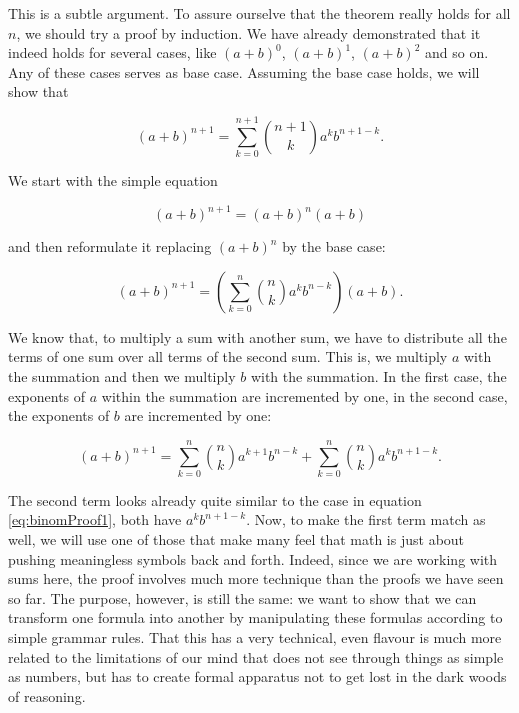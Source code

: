 \documentclass{scrreprt}
\begin{document}
This is a subtle argument.
To assure ourselve
that the theorem really holds for all $n$,
we should try a proof by induction. 
We have already demonstrated
that it indeed holds for several cases,
like $(a + b)^0$, $(a + b)^1$, $(a + b)^2$
and so on.
Any of these cases serves as base case.
Assuming the base case holds,
we will show that

\begin{equation}\label{eq:binomProof1}
  (a + b)^{n + 1} = \sum_{k=0}^{n + 1}{\binom{n + 1}{k}a^kb^{n+1-k}}.
\end{equation}

We start with the simple equation

\begin{equation}
  (a + b)^{n + 1} = (a + b)^n (a + b)
\end{equation}

and then reformulate it replacing $(a + b)^n$ by the base case:

\begin{equation}
  (a + b)^{n + 1} = \left(\sum_{k=0}^{n}{\binom{n}{k}a^kb^{n-k}}\right) (a + b).
\end{equation}

We know that, to multiply a sum with another sum, 
we have to distribute
all the terms of one sum over all terms of the second sum.
This is, we multiply $a$ with the summation 
and then we multiply $b$ with the summation.
In the first case, the exponents of $a$ within the summation
are incremented by one, in the second case,
the exponents of $b$ are incremented by one:

\begin{equation}\label{eq:binomProofDist1}
  (a + b)^{n + 1} = \sum_{k=0}^{n}{\binom{n}{k}a^{k+1}b^{n-k}} +
                    \sum_{k=0}^{n}{\binom{n}{k}a^kb^{n+1-k}}.
\end{equation}

The second term looks already quite similar to the case
in equation \ref{eq:binomProof1}, 
both have $a^kb^{n+1-k}$.
Now, to make the first term match as well,
we will use one of those  
that make many feel that math is just 
about pushing meaningless symbols back and forth.
Indeed, since we are working with sums here,
the proof involves much more technique 
than the proofs we have seen so far.
The purpose, however, is still the same:
we want to show that we can transform 
one formula into another 
by manipulating these formulas according to
simple grammar rules.
That this has a very technical, even 
flavour is much more related to the limitations
of our mind that does not see through things
as simple as numbers,
but has to create formal apparatus
not to get lost in the dark woods of reasoning.
\end{document}
